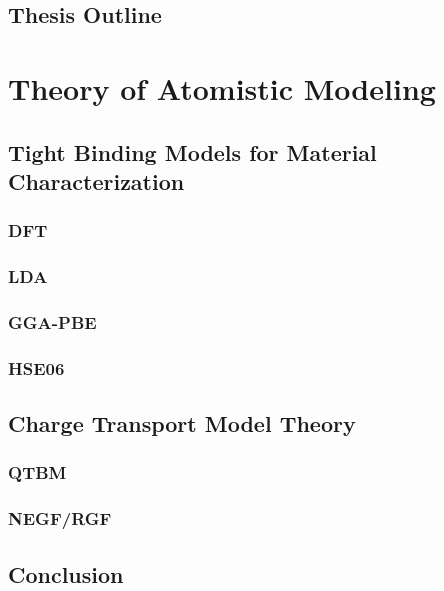 \documentclass[microe]{ritthesis}
\begin{document}
\section{Thesis Outline}

\chapter{Theory of Atomistic Modeling}
\section{Tight Binding Models for Material Characterization}
\subsection{DFT}
\subsection{LDA}
\subsection{GGA-PBE}
\subsection{HSE06}

\section{Charge Transport Model Theory}
\subsection{QTBM}
\subsection{NEGF/RGF}
\section{Conclusion}



\end{document}
